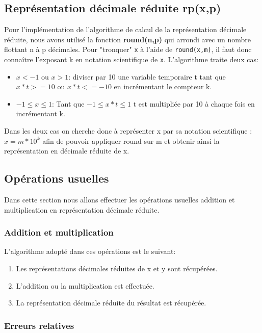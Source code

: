 \documentclass{article}
\begin{document}
\subsection{Représentation décimale réduite rp(x,p)}
\indent Pour l'implémentation de l'algorithme de calcul de la représentation décimale réduite, nous avons utilisé la fonction \textbf{round(n,p)} qui  arrondi avec un nombre flottant n à p décimales. Pour "tronquer" \texttt{x} à l'aide de \texttt{round(x,m)}, il faut donc connaître l'exposant k en notation scientifique de \texttt{x}. L'algorithme traite deux cas: 
\begin{itemize}
\item $x < -1$ ou $x > 1$: diviser par 10 une variable temporaire t tant que  $x*t>=10$ ou $x*t<=-10$ en incrémentant le compteur k. 
\item $-1\leq x \leq1$: Tant que $-1\leq x*t \leq1$ t est multipliée par 10 à chaque fois en incrémentant k.
\end{itemize}

\indent Dans les deux cas on cherche donc à représenter x par sa notation scientifique : $x=m*10^k$ afin de pouvoir appliquer round sur m et obtenir ainsi la représentation en décimale réduite de x.
\subsection{Opérations usuelles}
Dans cette section nous allons effectuer les opérations usuelles addition et multiplication en représentation décimale réduite.
\subsubsection{Addition et multiplication}
L'algorithme adopté dans ces opérations est le suivant:
\begin{enumerate}
    \item Les représentations décimales réduites de x et y sont récupérées.
    \item L'addition ou la multiplication est effectuée.
    \item La représentation décimale réduite du résultat est récupérée.
\end{enumerate}
\subsubsection{Erreurs relatives}
\end{document}
